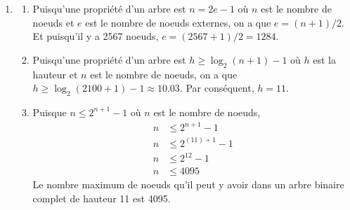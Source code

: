 \documentclass[12pt]{book}
\begin{document}
\newcommand{\reporttitle}{Laboratoire 3}
\newcommand{\reportauthorOne}{Kien Do}
\newcommand{\cidOne}{300163370}





\begin{enumerate}
    
    \item
    \begin{enumerate}
        \item Puisqu'une propriété d'un arbre est $n = 2e - 1$ où $n$ est le nombre de noeuds et $e$ est le nombre de noeuds externes, on a que $e = (n+1)/2$. Et puisqu'il y a 2567 noeuds, $e = (2567+1)/2 = 1284.$
        \item Puisqu'une propriété d'un arbre est $h \geq \log_{2}(n+1)-1$ où $h$ est la hauteur et $n$ est le nombre de noeuds, on a que $h \geq \log_{2}(2100+1)-1 \approx 10.03$. Par conséquent, $h=11$.
    
        \item Puisque $n \leq 2^{n+1}-1$ où $n$ est le nombre de noeuds,
        \begin{align*}
            n &\leq 2^{n+1}-1 \\
            n &\leq 2^{(11)+1}-1 \\
            n &\leq 2^{12}-1 \\
            n &\leq 4095
        \end{align*}
        Le nombre maximum de noeuds qu'il peut y avoir dans un arbre binaire complet de hauteur 11 est 4095.
    \end{enumerate}
    

\end{enumerate}
\end{document}
